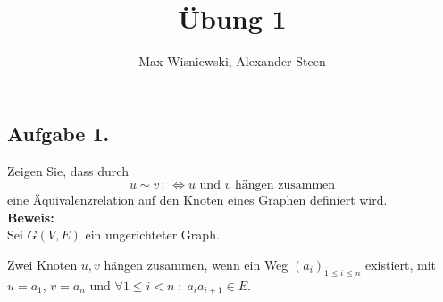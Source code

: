 \documentclass[11pt,a4paper,ngerman]{article}
\date{}
\title{Übung 1}
\author{Max Wisniewski, Alexander Steen}
\begin{document}

\renewcommand{\figurename}{Figure}

\maketitle
\thispagestyle{fancy}

\subsection*{Aufgabe 1.}
Zeigen Sie, dass durch
$$
	u \sim v \, : \, \Leftrightarrow u \text{ und } v \text{ hängen zusammen}
$$
eine Äquivalenzrelation auf den Knoten eines Graphen definiert wird.\\

\textbf{Beweis:}\\
Sei  $ G(V,E) $ ein ungerichteter Graph.

Zwei Knoten $u,v$ hängen zusammen, wenn ein Weg $(a_i)_{1\leq i \leq n}$ existiert, mit $u = a_1$, $v = a_n$ und 
$\forall 1 \leq i < n \; : \; a_ia_{i+1} \in E$.\\
\end{document}
